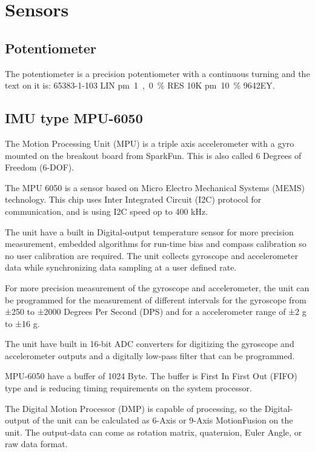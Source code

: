 \section{Sensors}
\label{sec:Sensors}

\subsection{Potentiometer}
The potentiometer is a precision potentiometer with a continuous turning and the text on it is: 65383-1-103 LIN \si{\pm1,0\%} RES 10K \si{\pm10\%} 9642EY. 

\subsection{IMU type MPU-6050}
  
The Motion Processing Unit (MPU) is a triple axis accelerometer with a gyro mounted on the breakout board from SparkFun. This is also called 6 Degrees of Freedom (6-DOF).

The MPU 6050 is a sensor based on Micro Electro Mechanical Systems (MEMS) technology. This chip uses Inter Integrated Circuit (I2C) protocol for communication, and is using I2C speed op to 400 kHz. 

The unit have a built in Digital-output temperature sensor for more precision measurement, embedded algorithms for run-time bias and compass calibration so no user calibration are required.
The unit collects gyroscope and accelerometer data while synchronizing data sampling at a user defined rate. 

For more precision measurement of the gyroscope and accelerometer, the unit can be programmed for the measurement of different intervals for the gyroscope from ±250 to ±2000 Degrees Per Second (DPS) and for a accelerometer range of ±2 g to ±16 g. 

The unit have built in 16-bit ADC converters for digitizing the gyroscope and accelerometer outputs and a digitally low-pass filter that can be programmed.

MPU-6050 have a buffer of 1024 Byte. The buffer is First In First Out (FIFO) type and is reducing timing requirements on the system processor.

The Digital Motion Processor (DMP) is capable of processing, so the Digital-output of the unit can be calculated as 6-Axis or 9-Axis MotionFusion on the unit. The output-data can come as rotation matrix, quaternion, Euler Angle, or raw data format. 

